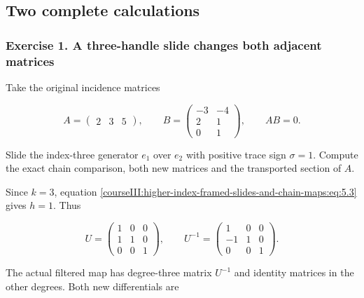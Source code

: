 \subsection{Two complete calculations}
\label{courseIII:higher-index-framed-slides-and-chain-maps:higher-slide-exercises}

\label{courseIII:higher-index-framed-slides-and-chain-maps:section-8}

\subsubsection{Exercise 1. A three-handle slide changes both adjacent matrices}
\label{courseIII:higher-index-framed-slides-and-chain-maps:exercise-1}

\label{courseIII:higher-slides:8.1}

Take the original incidence matrices

\begin{equation}
A=\begin{pmatrix}2&3&5\end{pmatrix},\qquad
 B=\begin{pmatrix}-3&-4\\2&1\\0&1\end{pmatrix},
 \qquad AB=0.
 \label{courseIII:higher-index-framed-slides-and-chain-maps:eq:8.1}
\end{equation}

Slide the index-three generator \(e_1\) over \(e_2\) with positive trace sign \(\sigma=1\). Compute the exact chain comparison, both new matrices and the transported section of \(A\).

Since \(k=3\), equation \eqref{courseIII:higher-index-framed-slides-and-chain-maps:eq:5.3} gives \(h=1\). Thus

\begin{equation}
U=\begin{pmatrix}1&0&0\\1&1&0\\0&0&1\end{pmatrix},
 \qquad
 U^{-1}=\begin{pmatrix}1&0&0\\-1&1&0\\0&0&1\end{pmatrix}.
 \label{courseIII:higher-index-framed-slides-and-chain-maps:eq:8.2}
\end{equation}

The actual filtered map has degree-three matrix \(U^{-1}\) and identity matrices in the other degrees. Both new differentials are

